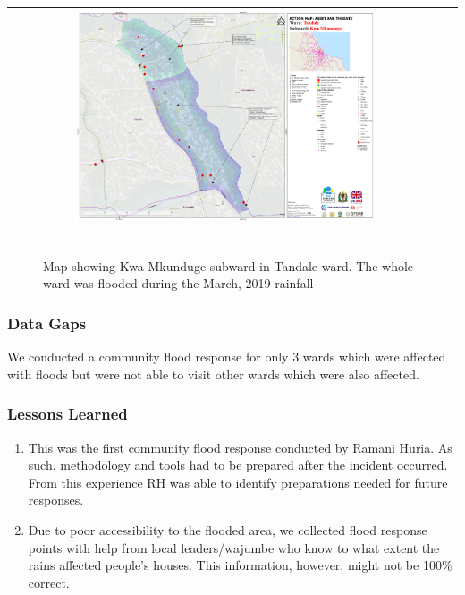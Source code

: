 \documentclass[a4paper,12pt,twoside]{article}
\begin{document}
\begin{tabular}{|c@{}c|}
	\hline
	\includegraphics[width=0.7\textwidth]{images/Flood_Response_Data_Viz.png}\\
	\hline
\end{tabular}
\begin{figure}[h]
	\caption{Map showing Kwa Mkunduge subward in Tandale ward. The whole ward was flooded during the March, 2019 rainfall}
	\centering
	\includegraphics[width=0\textwidth]{images/Building_Footprint_Digitization.png}
\end{figure}

\subsubsection{Data Gaps}
We conducted a community flood response for only 3 wards which were affected with floods but were not able to visit other wards which were also affected.

\subsubsection{Lessons Learned}
\begin{enumerate}
    \item This was the first community flood response conducted by Ramani Huria. As such, methodology and tools had to be prepared after the incident occurred. From this experience RH was able to identify preparations needed for future responses.
    \item Due to poor accessibility to the flooded area, we collected flood response points with help from local leaders/wajumbe who know to what extent the rains affected people’s houses. This information, however, might not be 100\% correct.
\end{enumerate}
\end{document}
